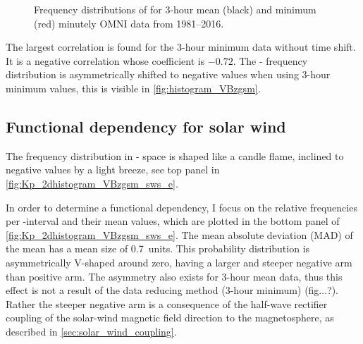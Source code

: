\begin{figure}[htb]
\begin{floatrow}
{		}{
			\caption{Frequency distributions of \vBz{} for 3-hour mean (black) and minimum (red) minutely OMNI data from 1981--2016.}
			\label{fig:histogram_VBzgsm}
		}
	\end{floatrow}
\end{figure}
The largest correlation is found for the 3-hour minimum data without time shift. It is a negative correlation whose coefficient is $-0.72$. The \Kp{}-\vBz{} frequency distribution is asymmetrically shifted to negative values when using 3-hour minimum values, this is visible in \autoref{fig:histogram_VBzgsm}.


\subsection{Functional dependency for solar wind}
The frequency distribution in \Kp-\vBz{} space is shaped like a candle flame, inclined to negative values by a light breeze, see top panel in \autoref{fig:Kp_2dhistogram_VBzgsm_sws_e}.
\begin{figure}
\end{figure}
In order to determine a functional dependency, I focus on the relative frequencies per \vBz-interval and their mean \Kp{} values, which are plotted in the bottom panel of \autoref{fig:Kp_2dhistogram_VBzgsm_sws_e}. The mean absolute deviation (MAD) of the mean has a mean size of \SI{0.7}{\Kp}~units. This probability distribution is asymmetrically V-shaped around zero, having a larger and steeper negative arm than positive arm. The asymmetry also exists for 3-hour mean data, thus this effect is not a result of the data reducing method (3-hour minimum) (fig...?). Rather the steeper negative arm is a consequence of the half-wave rectifier coupling of the solar-wind magnetic field direction to the magnetosphere, as described in \autoref{sec:solar_wind_coupling}.\\
